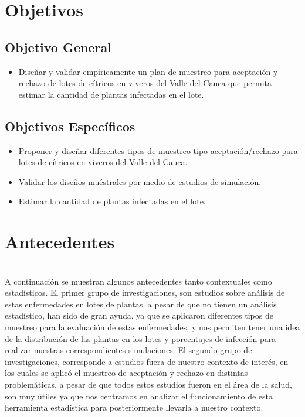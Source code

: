\section{Objetivos}
\subsection{Objetivo General}
\begin{itemize}
\item Dise\~{n}ar y validar emp\'{i}ricamente un plan de muestreo para aceptaci\'{o}n y rechazo de lotes de c\'{i}tricos en viveros del Valle del Cauca que permita estimar la cantidad de plantas infectadas en el lote.
\end{itemize}
\subsection{Objetivos Espec\'{i}ficos}
\begin{itemize}
\item Proponer y dise\~{n}ar diferentes tipos de muestreo tipo aceptaci\'{o}n/rechazo para lotes de c\'{i}tricos en viveros del Valle del Cauca.
\item Validar los dise\~{n}os mu\'{e}strales por medio de estudios de simulaci\'{o}n.
\item Estimar la cantidad de plantas infectadas en el lote.
\end{itemize}
\section{Antecedentes}
~\\A continuaci\'{o}n se muestran algunos antecedentes tanto contextuales como estad\'{i}sticos. El primer grupo de investigaciones, son estudios sobre an\'{a}lisis de estas enfermedades en lotes de plantas, a pesar de que no tienen un an\'{a}lisis estad\'{i}stico, han sido de gran ayuda, ya que se aplicaron diferentes tipos de muestreo para la evaluaci\'{o}n de estas enfermedades, y nos permiten tener una idea de la distribuci\'{o}n de las plantas en los lotes y porcentajes de infecci\'{o}n para realizar nuestras correspondientes simulaciones. El segundo grupo de investigaciones, corresponde a estudios fuera de nuestro contexto de inter\'{e}s, en los cuales se aplic\'{o} el muestreo de aceptaci\'{o}n y rechazo en distintas problem\'{a}ticas, a pesar de que todos estos estudios fueron en el \'{a}rea de la salud, son muy \'{u}tiles ya que nos centramos en analizar el funcionamiento de esta herramienta estad\'{i}stica para posteriormente llevarla a nuestro contexto.

